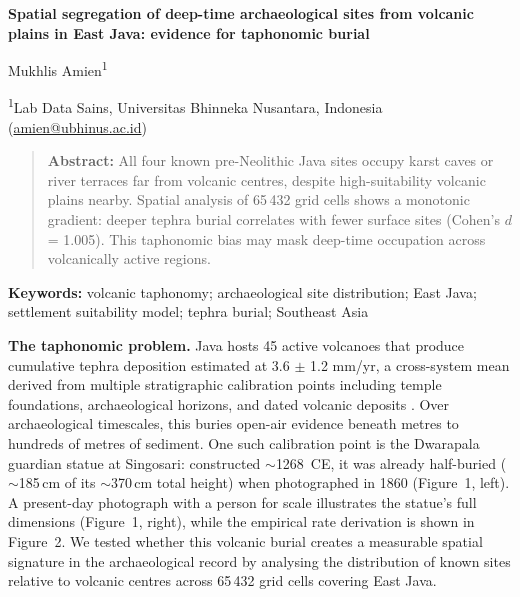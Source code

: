 \documentclass[12pt]{article}
\begin{document}
\begin{center}
{\large\bfseries Spatial segregation of deep-time archaeological sites from volcanic plains in East Java: evidence for taphonomic burial}

\vspace{6pt}

Mukhlis Amien\textsuperscript{1}

\vspace{4pt}

{\small\textsuperscript{1}Lab Data Sains, Universitas Bhinneka Nusantara, Indonesia (\href{mailto:amien@ubhinus.ac.id}{amien@ubhinus.ac.id})}
\end{center}

\begin{quote}
\small\textbf{Abstract:} All four known pre-Neolithic Java sites occupy karst caves or river terraces far from volcanic centres, despite high-suitability volcanic plains nearby. Spatial analysis of 65\,432 grid cells shows a monotonic gradient: deeper tephra burial correlates with fewer surface sites (Cohen's $d$ = 1.005). This taphonomic bias may mask deep-time occupation across volcanically active regions.
\end{quote}

\textbf{Keywords:} volcanic taphonomy; archaeological site distribution; East Java; settlement suitability model; tephra burial; Southeast Asia


\textbf{The taphonomic problem.}
Java hosts 45 active volcanoes that produce cumulative tephra deposition estimated at 3.6 $\pm$ 1.2 mm/yr, a cross-system mean derived from multiple stratigraphic calibration points including temple foundations, archaeological horizons, and dated volcanic deposits \citep{Amien2026a}.
Over archaeological timescales, this buries open-air evidence beneath metres to hundreds of metres of sediment.
One such calibration point is the Dwarapala guardian statue at Singosari: constructed $\sim$1268~CE, it was already half-buried ($\sim$185\,cm of its $\sim$370\,cm total height) when photographed in 1860 (Figure~1, left). A present-day photograph with a person for scale illustrates the statue's full dimensions (Figure~1, right), while the empirical rate derivation is shown in Figure~2.
We tested whether this volcanic burial creates a measurable spatial signature in the archaeological record by analysing the distribution of known sites relative to volcanic centres across 65\,432 grid cells covering East Java.
\end{document}
